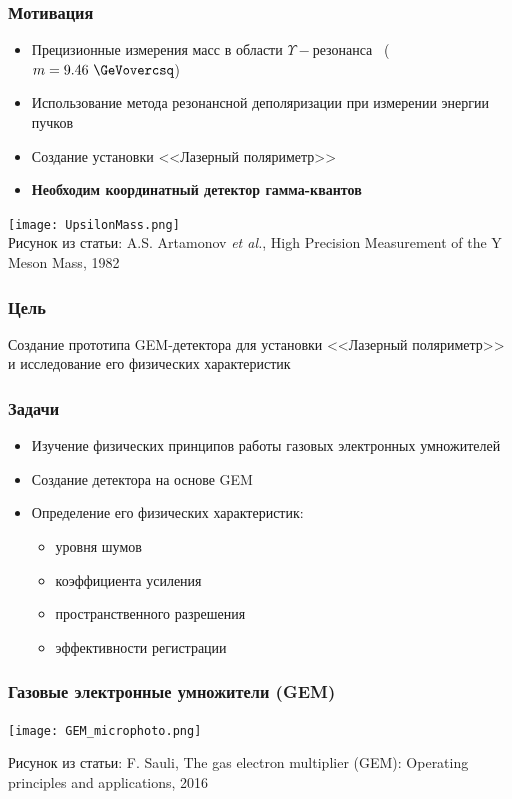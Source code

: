 \documentclass[14pt]{beamer}
\begin{document}
\begin{frame}
	\frametitle{Мотивация}
	\begin{minipage}[h]{0.55\linewidth}
	\small{
	\begin{itemize}
		\item Прецизионные измерения масс в области $\Upsilon-\text{резонанса}$
		~($m = 9.46~\GeVovercsq$) 
		\item Использование метода резонансной деполяризации при измерении энергии пучков
		\item Создание установки <<Лазерный поляриметр>>
		\item \textbf{Необходим координатный детектор гамма-квантов}
	\end{itemize}}
	\hfill
	\end{minipage}
		\begin{minipage}[h]{0.43\linewidth}
			\texttt{[image: UpsilonMass.png]}
			\\\tiny{Рисунок из статьи: A.S. Artamonov \emph{et al.}, High Precision Measurement of the Y Meson Mass, 1982}
		\end{minipage}
	\end{frame}

\begin{frame}
\frametitle{Цель}
Создание прототипа GEM-детектора для установки <<Лазерный поляриметр>> и исследование его физических характеристик
\end{frame}

\begin{frame}[t]
\frametitle{Задачи}
	\begin{itemize}
		\item Изучение физических принципов работы газовых электронных умножителей
		\item Создание детектора на основе GEM 
		\item Определение его физических характеристик:
		\begin{itemize}
			\item уровня шумов
			\item коэффициента усиления
			\item пространственного разрешения
			\item эффективности регистрации
		\end{itemize}
	\end{itemize}
\end{frame}

\begin{frame}
\frametitle{Газовые электронные умножители (GEM)}
	\begin{minipage}[t][0.6\textheight]{\linewidth}
		\centering
		\texttt{[image: GEM\_microphoto.png]}
		
	\end{minipage}%
\newline \centering	\tiny{Рисунок из статьи: F. Sauli, The gas electron multiplier (GEM): Operating principles and applications, 2016}	
\end{frame}
\end{document}

